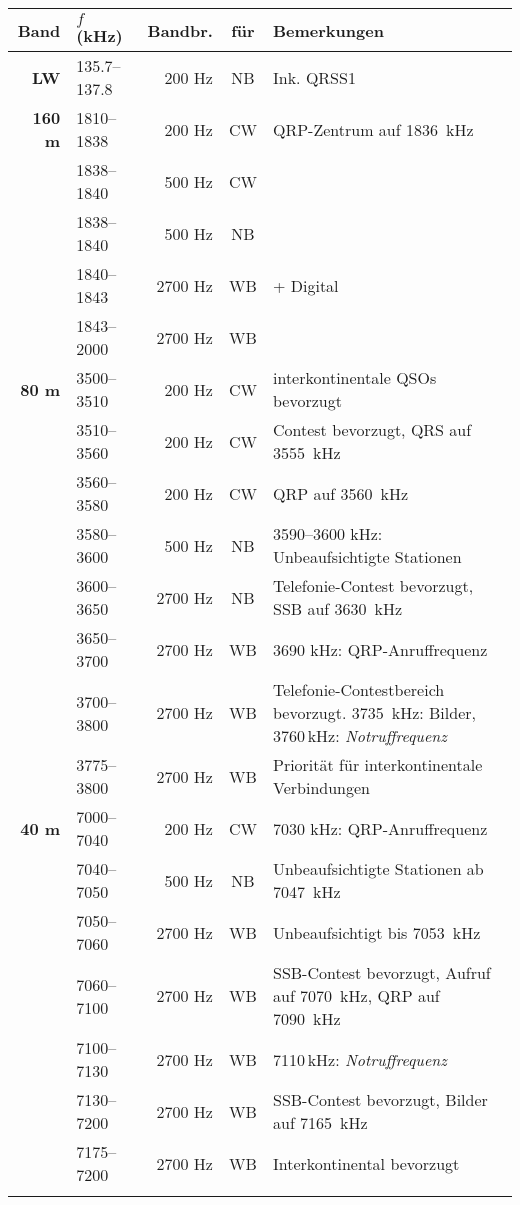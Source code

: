 {
\setlength{\belowrulesep}{1pt}
\setlength{\aboverulesep}{1pt}
\newcommand{\notruf}[1]{\textcolor{nr}{ #1\,kHz: \textit{Notruffrequenz}}}

\begin{longtabu} to 
\rowfont \bfseries Band & $f$ (kHz) & Bandbr. & für & Bemerkungen \\
\toprule
\endhead

\bfseries LW & 135.7–137.8 & 200 Hz & NB & Ink. QRSS1 \\  \midrule

\bfseries 160 m & 1810–1838 & 200 Hz & CW & QRP-Zentrum auf 1836 kHz \\  \midrule
 & 1838–1840 & 500 Hz & CW \\ \midrule
 & 1838–1840 & 500 Hz & NB \\ \midrule
 & 1840–1843 & 2700 Hz & WB & + Digital \\ \midrule
 & 1843–2000 & 2700 Hz & WB \\  \midrule

\bfseries 80 m & 3500–3510 & 200 Hz & CW & interkontinentale QSOs bevorzugt \\  \midrule
 & 3510–3560 & 200 Hz & CW & Contest bevorzugt, QRS auf 3555 kHz \\ \midrule
 & 3560–3580 & 200 Hz & CW & QRP auf 3560 kHz \\ \midrule
 & 3580–3600 & 500 Hz & NB & 3590–3600 kHz: Unbeaufsichtigte Stationen\\ \midrule
 & 3600–3650 & 2700 Hz & NB & Telefonie-Contest bevorzugt, SSB auf 3630 kHz\\ \midrule
 & 3650–3700 & 2700 Hz & WB & 3690 kHz: QRP-Anruffrequenz\\ \midrule
 & 3700–3800 & 2700 Hz & WB & Telefonie-Contest­bereich bevorzugt. 3735 kHz: Bilder, \notruf{3760}\\ \midrule
 & 3775–3800 & 2700 Hz & WB & Priorität für interkontinentale Verbindungen \\  \midrule

\bfseries 40 m & 7000–7040 & 200 Hz & CW & 7030 kHz: QRP-Anruffrequenz \\  \midrule
 & 7040–7050 & 500 Hz & NB & Unbeaufsichtigte Stationen ab 7047 kHz \\ \midrule
 & 7050–7060 & 2700 Hz & WB & Unbeaufsichtigt bis 7053 kHz \\ \midrule
 & 7060–7100 & 2700 Hz & WB & SSB-Contest bevorzugt, Aufruf auf 7070 kHz, QRP auf 7090 kHz \\ \midrule
 & 7100–7130 & 2700 Hz & WB & \notruf{7110} \\ \midrule
 & 7130–7200 & 2700 Hz & WB & SSB-Contest bevorzugt, Bilder auf 7165 kHz \\ \midrule
 & 7175–7200 & 2700 Hz & WB & Interkontinental bevorzugt \\  \midrule
\end{longtabu}

}
